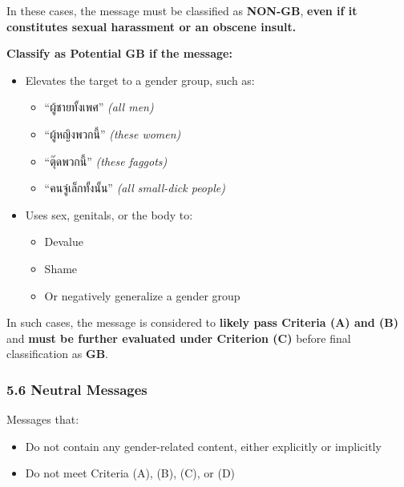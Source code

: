 \documentclass[12pt,oneside,openright,a4paper]{cpe-english-project}
\begin{document}
In these cases, the message must be classified as \textbf{NON-GB},
\textbf{even if it constitutes sexual harassment or an obscene insult.}

\textbf{Classify as Potential GB if the message:}

\begin{itemize}
\setlength{\itemsep}{0.15\baselineskip}
\setlength{\parsep}{0pt}
\setlength{\parskip}{0pt}
\item
  Elevates the target to a gender group, such as:

  \begin{itemize}
\setlength{\itemsep}{0.15\baselineskip}
\setlength{\parsep}{0pt}
\setlength{\parskip}{0pt}
    \item
    ``ผู้ชายทั้งเพศ'' \emph{(all men)}
  \item
    ``ผู้หญิงพวกนี้'' \emph{(these women)}
  \item
    ``ตุ๊ดพวกนี้'' \emph{(these faggots)}
  \item
    ``คนจู๋เล็กทั้งนั้น'' \emph{(all small-dick people)}
  \end{itemize}
\item
  Uses sex, genitals, or the body to:

  \begin{itemize}
\setlength{\itemsep}{0.15\baselineskip}
\setlength{\parsep}{0pt}
\setlength{\parskip}{0pt}
    \item
    Devalue
  \item
    Shame
  \item
    Or negatively generalize a gender group
  \end{itemize}
\end{itemize}

In such cases, the message is considered to \textbf{likely pass Criteria
(A) and (B)} and \textbf{must be further evaluated under Criterion (C)}
before final classification as \textbf{GB}.

\subsubsection{5.6 Neutral Messages}\label{neutral-messages}

Messages that:

\begin{itemize}
\setlength{\itemsep}{0.15\baselineskip}
\setlength{\parsep}{0pt}
\setlength{\parskip}{0pt}
\item
  Do not contain any gender-related content, either explicitly or
  implicitly
\item
  Do not meet Criteria (A), (B), (C), or (D)
\end{itemize}
\end{document}
